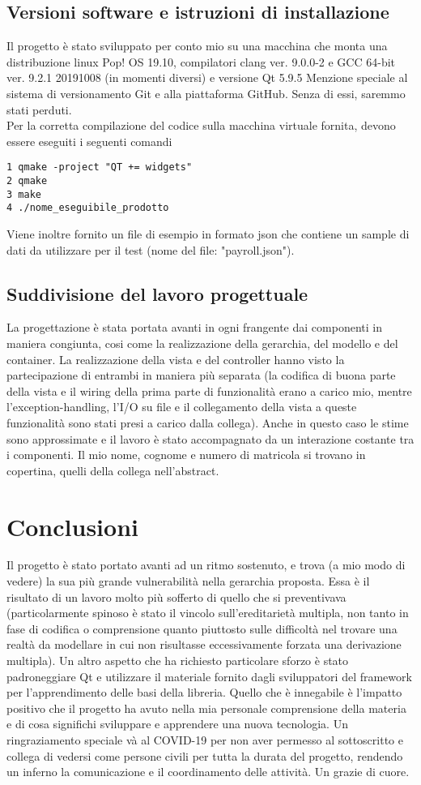 \documentclass[a4paper,10pt]{article}
\begin{document}
\subsection{Versioni software e istruzioni di installazione}
Il progetto è stato sviluppato per conto mio su una macchina che monta una distribuzione linux Pop! OS 19.10, compilatori clang ver. 9.0.0-2 e GCC 64-bit ver. 9.2.1 20191008 (in momenti diversi) e versione Qt 5.9.5
Menzione speciale al sistema di versionamento Git e alla piattaforma GitHub. Senza di essi, saremmo stati perduti.\\
Per la corretta compilazione del codice sulla macchina virtuale fornita, devono essere eseguiti i seguenti comandi
\begin{verbatim}
1 qmake -project "QT += widgets"
2 qmake 
3 make
4 ./nome_eseguibile_prodotto
\end{verbatim}
Viene inoltre fornito un file di esempio in formato json che contiene un sample di dati da utilizzare per il test (nome del file: "payroll.json"). 
\subsection{Suddivisione del lavoro progettuale}
La progettazione è stata portata avanti in ogni frangente dai componenti in maniera congiunta, cosi come la realizzazione della gerarchia, del modello e del container. La realizzazione della vista e del controller hanno visto la partecipazione di entrambi in maniera più separata (la codifica di buona parte della vista e il wiring della prima parte di funzionalità erano a carico mio, mentre l'exception-handling, l'I/O su file  e il collegamento della vista a queste funzionalità sono stati presi a carico dalla collega). Anche in questo caso le stime sono approssimate e il lavoro è stato accompagnato da un interazione costante tra i componenti. Il mio nome, cognome e numero di matricola si trovano in copertina, quelli della collega nell'abstract. 

\section{Conclusioni}
Il progetto è stato portato avanti ad un ritmo sostenuto, e trova (a mio modo di vedere) la sua più grande vulnerabilità nella gerarchia proposta. Essa è il risultato di un lavoro molto più sofferto di quello che si preventivava (particolarmente spinoso è stato il vincolo sull'ereditarietà multipla, non tanto in fase di codifica o comprensione quanto piuttosto sulle difficoltà nel trovare una realtà da modellare in cui non risultasse eccessivamente forzata una derivazione multipla). Un altro aspetto che ha richiesto particolare sforzo è stato padroneggiare Qt e utilizzare il materiale fornito dagli sviluppatori del framework per l'apprendimento delle basi della libreria.
Quello che è innegabile è l'impatto positivo che il progetto ha avuto nella mia personale comprensione della materia e di cosa significhi sviluppare e apprendere una nuova tecnologia.  
Un ringraziamento speciale và al COVID-19 per non aver permesso al sottoscritto e collega di vedersi come persone civili per tutta la durata del progetto, rendendo un inferno la comunicazione e il coordinamento delle attività. Un grazie di cuore.
\end{document}
